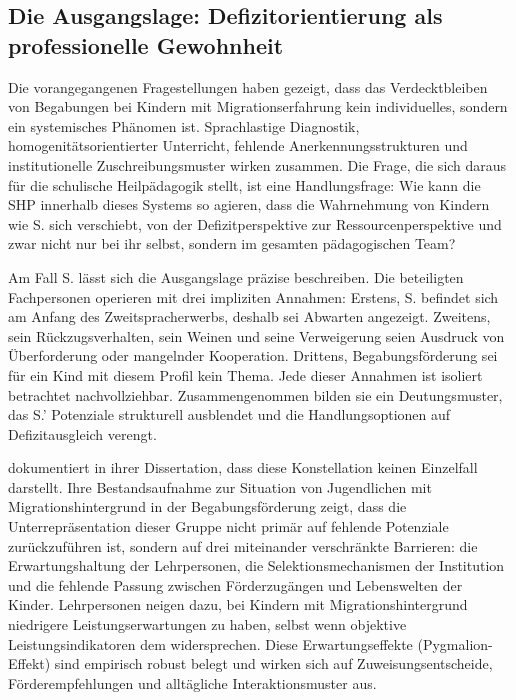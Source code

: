 \documentclass[ngerman, a4paper]{article}
\begin{document}
\subsection{Die Ausgangslage: Defizitorientierung als professionelle Gewohnheit}

Die vorangegangenen Fragestellungen haben gezeigt, dass das Verdecktbleiben von
Begabungen bei Kindern mit Migrationserfahrung kein individuelles, sondern ein
systemisches Phänomen ist. Sprachlastige Diagnostik, homogenitätsorientierter
Unterricht, fehlende Anerkennungsstrukturen und institutionelle Zuschreibungsmuster
wirken zusammen. Die Frage, die sich daraus für die schulische Heilpädagogik stellt,
ist eine Handlungsfrage: Wie kann die SHP innerhalb dieses Systems so agieren, dass
die Wahrnehmung von Kindern wie S. sich verschiebt, von der Defizitperspektive zur
Ressourcenperspektive und zwar nicht nur bei ihr selbst, sondern im gesamten
pädagogischen Team?

Am Fall S. lässt sich die Ausgangslage präzise beschreiben. Die beteiligten
Fachpersonen operieren mit drei impliziten Annahmen: Erstens, S. befindet sich am
Anfang des Zweitspracherwerbs, deshalb sei Abwarten angezeigt. Zweitens, sein
Rückzugsverhalten, sein Weinen und seine Verweigerung seien Ausdruck von
Überforderung oder mangelnder Kooperation. Drittens, Begabungsförderung sei für
ein Kind mit diesem Profil kein Thema. Jede dieser Annahmen ist isoliert betrachtet
nachvollziehbar. Zusammengenommen bilden sie ein Deutungsmuster, das S.' Potenziale
strukturell ausblendet und die Handlungsoptionen auf Defizitausgleich verengt.

\textcite[S.\,7--9,\,143--184]{leikhof2021jugendliche} dokumentiert in ihrer Dissertation, dass diese Konstellation keinen
Einzelfall darstellt. Ihre Bestandsaufnahme zur Situation von Jugendlichen mit
Migrationshintergrund in der Begabungsförderung zeigt, dass die Unterrepräsentation
dieser Gruppe nicht primär auf fehlende Potenziale zurückzuführen ist, sondern auf
drei miteinander verschränkte Barrieren: die Erwartungshaltung der Lehrpersonen,
die Selektionsmechanismen der Institution und die fehlende Passung zwischen
Förderzugängen und Lebenswelten der Kinder. Lehrpersonen neigen dazu, bei Kindern
mit Migrationshintergrund niedrigere Leistungserwartungen zu haben, selbst wenn
objektive Leistungsindikatoren dem widersprechen. Diese Erwartungseffekte
(Pygmalion-Effekt) sind empirisch robust belegt und wirken sich auf
Zuweisungsentscheide, Förderempfehlungen und alltägliche Interaktionsmuster aus.
\end{document}
